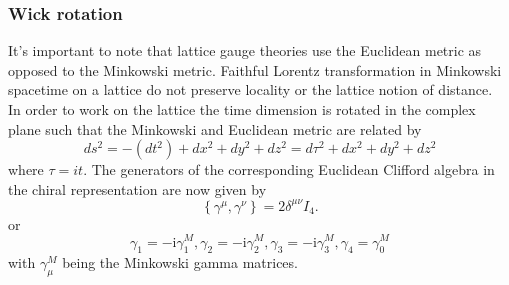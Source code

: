 \documentclass[a4paper,10pt]{article}
\begin{document}
\subsubsection{Wick rotation}
It's important to note that lattice gauge theories use the Euclidean metric as opposed to the Minkowski metric. Faithful Lorentz transformation in Minkowski spacetime on a lattice do not preserve locality or the lattice notion of distance.\\In order to work on the lattice the time dimension is rotated in the complex plane such that the Minkowski and Euclidean metric are related by 
\begin{equation}
d s^{2}=-\left(d t^{2}\right)+d x^{2}+d y^{2}+d z^{2} = d \tau^{2}+d x^{2}+d y^{2}+d z^{2} 
\end{equation}
where $\tau = it$. The generators of the corresponding Euclidean Clifford algebra in the chiral representation are now given by 
\begin{equation}
\left\{\gamma^{\mu}, \gamma^{\nu}\right\}=2 \delta^{\mu \nu} I_{4}.
\end{equation}
or 
\begin{equation}
\gamma_{1}=-\mathrm{i} \gamma_{1}^{M}, \gamma_{2}=-\mathrm{i} \gamma_{2}^{M}, \gamma_{3}=-\mathrm{i} \gamma_{3}^{M}, \gamma_{4}=\gamma_{0}^{M}
\end{equation}
with $\gamma_{\mu}^{M}$ being the Minkowski gamma matrices.
\end{document}
